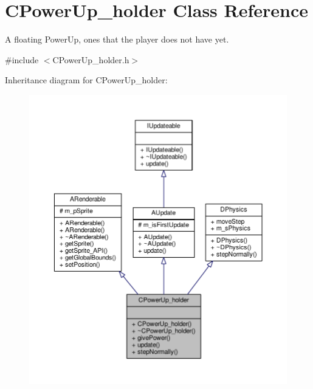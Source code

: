 \hypertarget{classCPowerUp__holder}{\section{C\-Power\-Up\-\_\-holder Class Reference}
\label{classCPowerUp__holder}
}


A floating Power\-Up, ones that the player does not have yet.  




{\ttfamily \#include $<$C\-Power\-Up\-\_\-holder.\-h$>$}



Inheritance diagram for C\-Power\-Up\-\_\-holder\-:
\nopagebreak
\begin{figure}[H]
\begin{center}
\leavevmode
\includegraphics[width=350pt]{classCPowerUp__holder__inherit__graph}
\end{center}
\end{figure}


